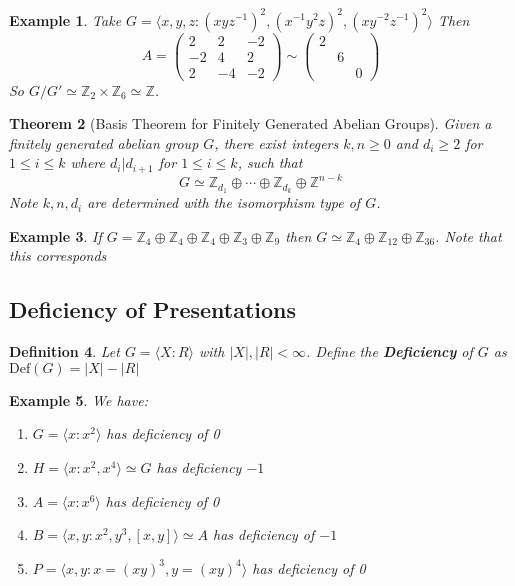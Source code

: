 \documentclass[a4paper,10pt]{article}
\newcommand{\ZZ}{\mathbb{Z}}
\newtheorem{thm}{Theorem}
\newtheorem{Def}[thm]{Definition}
\newtheorem{eg}[thm]{Example}
\begin{document}
\begin{eg}
Take $G = \langle x,y,z : (xyz^{-1})^2, (x^{-1}y^2z)^2, (xy^{-2}z^{-1})^2 \rangle$ Then 
\[ A = \begin{pmatrix} 2 & 2 & -2 \\ -2 & 4 & 2 \\ 2 & -4 & -2 \end{pmatrix} \sim \begin{pmatrix} 2 \\ & 6 \\ & & 0 \end{pmatrix} \]
So $G / G' \simeq \ZZ_2 \times \ZZ_6 \simeq \ZZ$. 
\end{eg}

\begin{thm}[Basis Theorem for Finitely Generated Abelian Groups]
Given a finitely generated abelian group $G$, there exist integers $k,n \geq 0$ and $d_i \geq 2$ for $1 \leq i \leq k$ where $d_i | d_{i+1}$ for $1 \leq i \leq k$, such that 
\[ G \simeq \ZZ_{d_1} \oplus \cdots \oplus \ZZ_{d_k} \oplus \ZZ^{n - k} \]
Note $k,n,d_i$ are determined with the isomorphism type of $G$.
\end{thm}

\begin{eg}
If $G = \ZZ_4 \oplus \ZZ_4 \oplus \ZZ_4 \oplus \ZZ_3 \oplus \ZZ_9$ then $G \simeq \ZZ_4 \oplus \ZZ_{12} \oplus \ZZ_{36}$. Note that this corresponds  
\end{eg}

\subsection{Deficiency of Presentations}

\begin{Def}
Let $G = \langle X : R \rangle$ with $|X|, |R| < \infty$. Define the \textbf{Deficiency} of $G$ as $\text{Def}(G) = |X| - |R|$
\end{Def}

\begin{eg}
We have:
\begin{enumerate}
\item $G = \langle x : x^2 \rangle$ has deficiency of 0
\item $H = \langle x : x^2, x^4 \rangle \simeq G$ has deficiency $-1$ 
\item $A = \langle x : x^6 \rangle$ has deficiency of 0
\item $B = \langle x, y : x^2, y^3, [x,y]\rangle \simeq A$ has deficiency of $-1$
\item $P = \langle x,y : x = (xy)^3, y = (xy)^4 \rangle$ has deficiency of 0
\end{enumerate}
\end{eg}
\end{document}
